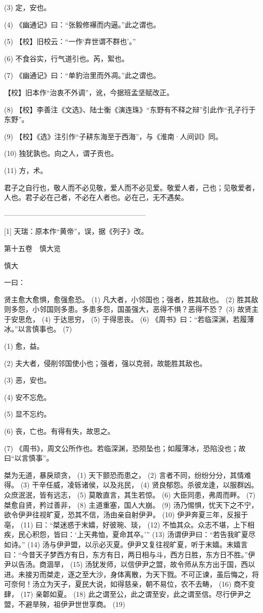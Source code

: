 \documentclass[12pt,UTF8]{ctexbook}
\begin{document}
(3) 定，安也。

(4) 《幽通记》曰：“张毅修襮而内逼。”此之谓也。

(5) 【校】旧校云：“一作‘弃世谓不群也’。”

(6) 不食谷实，行气道引也。芮，絮也。

(7) 《幽通记》曰：“单豹治里而外凋。”此之谓也。

【校】旧本作“治衷不外调”，讹，今据班孟坚赋改正。

(8) 【校】李善注《文选》、陆士衡《演连珠》“东野有不释之辩”引此作“孔子行于东野”。

(9) 【校】《选》注引作“子耕东海至于西海”，与《淮南·人间训》同。

(10) 独犹孰也。向之人，谓子贡也。

(11) 方，术。

君子之自行也，敬人而不必见敬，爱人而不必见爱。敬爱人者，己也；见敬爱者，人也。君子必在己者，不必在人者也。必在己，无不遇矣。




————————————————————

[1] 天瑞：原本作“黄帝”，误，据《列子》改。





第十五卷　慎大览



慎大


一曰：

贤主愈大愈惧，愈强愈恐。 (1) 凡大者，小邻国也；强者，胜其敌也。 (2) 胜其敌则多怨，小邻国则多患。多患多怨，国虽强大，恶得不惧？恶得不恐？ (3) 故贤主于安思危， (4) 于达思穷， (5) 于得思丧。 (6) 《周书》曰：“若临深渊，若履薄冰。”以言慎事也。 (7)

(1) 愈，益。

(2) 夫大者，侵削邻国使小也；强者，强以克弱，故能胜其敌也。

(3) 恶，安也。

(4) 安不忘危。

(5) 显不忘约。

(6) 丧，亡也。有得有失，故思之。

(7) 《周书》，周文公所作也。若临深渊，恐陨坠也；如履薄冰，恐陷没也；故曰“以言慎事”。

桀为无道，暴戾顽贪， (1) 天下颤恐而患之， (2) 言者不同，纷纷分分，其情难得。 (3) 干辛任威，凌轹诸侯，以及兆民， (4) 贤良郁怨。杀彼龙逢，以服群凶。众庶泯泯，皆有远志， (5) 莫敢直言，其生若惊。 (6) 大臣同患，弗周而畔。 (7) 桀愈自贤，矜过善非， (8) 主道重塞，国人大崩。 (9) 汤乃惕惧，忧天下之不宁，欲令伊尹往视旷夏，恐其不信，汤由亲自射伊尹。 (10) 伊尹奔夏三年，反报于亳， (11) 曰：“桀迷惑于末嬉，好彼琬、琰， (12) 不恤其众。众志不堪，上下相疾，民心积怨，皆曰：‘上天弗恤，夏命其卒。’” (13) 汤谓伊尹曰：“若告我旷夏尽如诗。” (14) 汤与伊尹盟，以示必灭夏。伊尹又复往视旷夏，听于末嬉。末嬉言曰：“今昔天子梦西方有日，东方有日，两日相与斗，西方日胜，东方日不胜。”伊尹以告汤。商涸旱， (15) 汤犹发师，以信伊尹之盟，故令师从东方出于国，西以进。未接刃而桀走，逐之至大沙，身体离散，为天下戮。不可正谏，虽后悔之，将可奈何！汤立为天子，夏民大说，如得慈亲，朝不易位，农不去畴， (16) 商不变肆， (17) 亲郼如夏。 (18) 此之谓至公，此之谓至安，此之谓至信。尽行伊尹之盟，不避旱殃，祖伊尹世世享商。 (19)
\end{document}
